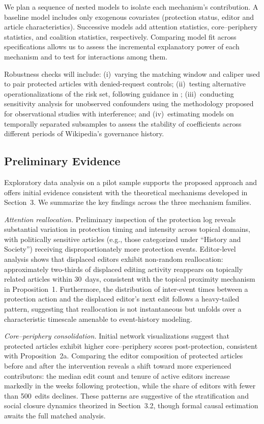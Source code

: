 \documentclass[11pt]{article}
\begin{document}
We plan a sequence of nested models to isolate each mechanism's contribution. A baseline model includes only exogenous covariates (protection status, editor and article characteristics). Successive models add attention statistics, core--periphery statistics, and coalition statistics, respectively. Comparing model fit across specifications allows us to assess the incremental explanatory power of each mechanism and to test for interactions among them.

Robustness checks will include: (i)~varying the matching window and caliper used to pair protected articles with denied-request controls; (ii)~testing alternative operationalizations of the risk set, following guidance in \citet{Lerner2020}; (iii)~conducting sensitivity analysis for unobserved confounders using the methodology proposed for observational studies with interference; and (iv)~estimating models on temporally separated subsamples to assess the stability of coefficients across different periods of Wikipedia's governance history.

\subsection{Preliminary Evidence}

Exploratory data analysis on a pilot sample supports the proposed approach and offers initial evidence consistent with the theoretical mechanisms developed in Section~3. We summarize the key findings across the three mechanism families.

\emph{Attention reallocation.} Preliminary inspection of the protection log reveals substantial variation in protection timing and intensity across topical domains, with politically sensitive articles (e.g., those categorized under ``History and Society'') receiving disproportionately more protection events. Editor-level analysis shows that displaced editors exhibit non-random reallocation: approximately two-thirds of displaced editing activity reappears on topically related articles within 30~days, consistent with the topical proximity mechanism in Proposition~1. Furthermore, the distribution of inter-event times between a protection action and the displaced editor's next edit follows a heavy-tailed pattern, suggesting that reallocation is not instantaneous but unfolds over a characteristic timescale amenable to event-history modeling.

\emph{Core--periphery consolidation.} Initial network visualizations suggest that protected articles exhibit higher core--periphery scores post-protection, consistent with Proposition~2a. Comparing the editor composition of protected articles before and after the intervention reveals a shift toward more experienced contributors: the median edit count and tenure of active editors increase markedly in the weeks following protection, while the share of editors with fewer than 500~edits declines. These patterns are suggestive of the stratification and social closure dynamics theorized in Section~3.2, though formal causal estimation awaits the full matched analysis.
\end{document}
